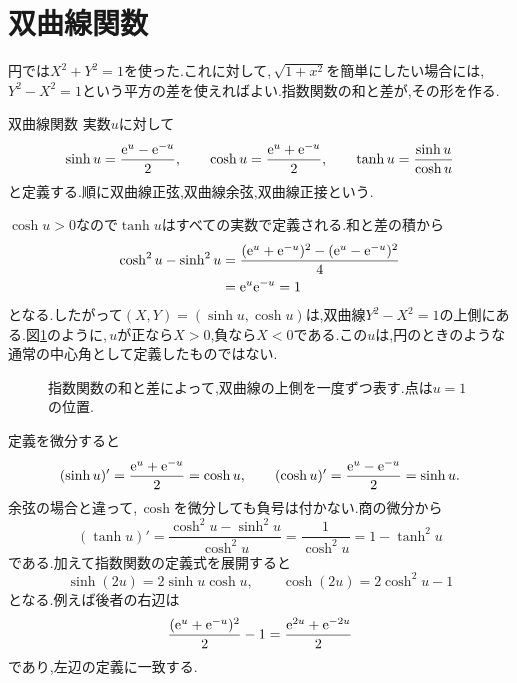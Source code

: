 \section{双曲線関数}\label{節:双曲線関数}

円では$X^2+Y^2=1$を使った.これに対して,\,$\sqrt{1+x^2}$を簡単にしたい場合には,\,$Y^2-X^2=1$という平方の差を使えればよい.指数関数の和と差が,その形を作る.

\begin{definition}{双曲線関数}
実数$u$に対して
\[
\sinh u=\frac{\mathrm{e}^u-\mathrm{e}^{-u}}2,\qquad
\cosh u=\frac{\mathrm{e}^u+\mathrm{e}^{-u}}2,\qquad
\tanh u=\frac{\sinh u}{\cosh u}
\]
と定義する.順に双曲線正弦,双曲線余弦,双曲線正接という.
\end{definition}

$\cosh u>0$なので$\tanh u$はすべての実数で定義される.和と差の積から
\[
\begin{aligned}
\cosh^2u-\sinh^2u
&=\frac{(\mathrm{e}^u+\mathrm{e}^{-u})^2-(\mathrm{e}^u-\mathrm{e}^{-u})^2}{4}\\
&=\mathrm{e}^u\mathrm{e}^{-u}=1
\end{aligned}
\]
となる.したがって$(X,Y)=(\sinh u,\cosh u)$は,双曲線$Y^2-X^2=1$の上側にある.図\ref{図:双曲線の媒介表示}のように,\,$u$が正なら$X>0$,負なら$X<0$である.この$u$は,円のときのような通常の中心角として定義したものではない.

\begin{figure}[htbp]
\centering
{}
\caption{指数関数の和と差によって,双曲線の上側を一度ずつ表す.点は$u=1$の位置.}
\label{図:双曲線の媒介表示}
\end{figure}

定義を微分すると
\[
(\sinh u)'=\frac{\mathrm{e}^u+\mathrm{e}^{-u}}2=\cosh u,
\qquad
(\cosh u)'=\frac{\mathrm{e}^u-\mathrm{e}^{-u}}2=\sinh u.
\]
余弦の場合と違って,\,$\cosh$を微分しても負号は付かない.商の微分から
\begin{equation}\label{式:双曲線正接の微分}
(\tanh u)'=\frac{\cosh^2u-\sinh^2u}{\cosh^2u}
=\frac1{\cosh^2u}=1-\tanh^2u
\end{equation}
である.加えて指数関数の定義式を展開すると
\begin{equation}\label{式:双曲線の二倍公式}
\sinh(2u)=2\sinh u\cosh u,\qquad
\cosh(2u)=2\cosh^2u-1
\end{equation}
となる.例えば後者の右辺は
\[
\frac{(\mathrm{e}^u+\mathrm{e}^{-u})^2}{2}-1
=\frac{\mathrm{e}^{2u}+\mathrm{e}^{-2u}}2
\]
であり,左辺の定義に一致する.

%
